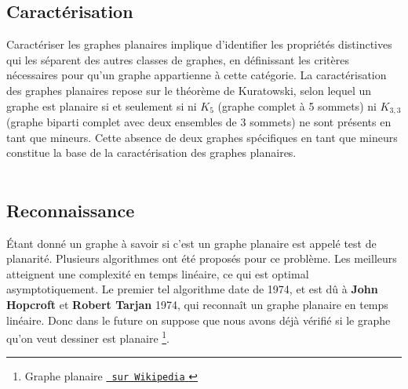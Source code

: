 \documentclass[hidelinks,letterpaper,12pt]{article}
\begin{document}
\bigbreak
\subsection{Caractérisation} 
\label{Caractérisation} 
Caractériser les graphes planaires implique d'identifier les propriétés distinctives qui les séparent des autres classes de graphes, en définissant les critères nécessaires pour qu'un graphe appartienne à cette catégorie. La caractérisation des graphes planaires repose sur le théorème de Kuratowski, selon lequel un graphe est planaire si et seulement si ni $K_{5}$ (graphe complet à 5 sommets) ni $K_{3,3}$ (graphe biparti complet avec deux ensembles de 3 sommets) ne sont présents en tant que mineurs. Cette absence de deux graphes spécifiques en tant que mineurs constitue la base de la caractérisation des graphes planaires.
\\ \\
\subsection{Reconnaissance} 
\label{Reconnaissance}
Étant donné un graphe à savoir si c'est un graphe planaire est appelé test de planarité. Plusieurs algorithmes ont été proposés pour ce problème. Les meilleurs atteignent une complexité en temps linéaire, ce qui est optimal asymptotiquement. Le premier tel algorithme date de 1974, et est dû à \textbf{John Hopcroft} et \textbf{Robert Tarjan} 1974, qui reconnaît un graphe planaire en temps linéaire. Donc dans le future on suppose que nous avons déjà vérifié si le graphe qu'on veut dessiner est planaire
\footnote{Graphe planaire 
\href{https://fr.wikipedia.org/wiki/Graphe_planaire}     
{\texttt{ sur Wikipedia} }}.   
\end{document}

